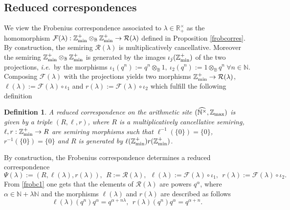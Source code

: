 \documentclass[noams,lp]{compositio}
\newtheorem{defn}[thm]{Definition} %
\def\B{{\mathbb B}}
\def\N{{\mathbb N}}
\def\R{{\mathbb R}}
\def\Z{{\mathbb Z}}
\def\cF{{\mathcal F}}
\def\cR{{\mathcal R}}
\newcommand{\ie}{{\it i.e.\/}\ }
\def\zmin{\Z_{\rm min}}
\def\zminp{\Z_{\rm min}^+}
\def\mc{multiplicatively cancellative }
\def\zmax{{\Z_{\rm max}}}
\def\arith{{(\wnt,\bar \N)}}
\def\wnt{{\widehat{\N^{\times}}}}
\def\nboplus{{\zmin^+\otimes_\B \zmin^+}}
\def\arith{{(\wnt,\zmax)}}
\begin{document}
\subsection{Reduced correspondences}
 We view  the Frobenius correspondence associated to $\lambda \in \R_+^\times$ as the homomorphism $\cF(\lambda):\nboplus\to \cR(\lambda)$
defined in Proposition \ref{frobcorres}. By construction, the semiring $\cR(\lambda)$ is multiplicatively cancellative. Moreover the semiring $\nboplus$ is generated by the images $\iota_j(\zminp)$ of the two projections, \ie by the morphisms
$
\iota_1(q^n):=q^n\otimes_\B 1, \    \iota_2(q^n):=1\otimes_\B q^n \ \forall n\in \N.
$
Composing $\cF(\lambda)$ with the projections yields two morphisms $\zminp\to\cR(\lambda)$,  $\ell(\lambda):=\cF(\lambda)\circ \iota_1$ and $r(\lambda):=\cF(\lambda)\circ \iota_2$  which fulfill the following definition


\begin{defn}\label{defcorr} A {\em reduced correspondence} on the arithmetic site $\arith$ is given by a triple $(R,\ell,r)$, where $R$ is a \mc semiring, $\ell, r: \zminp\to R$ are semiring morphisms such that $\ell^{-1}(\{0\})=\{0\}$, $r^{-1}(\{0\})=\{0\}$
and  $R$ is generated by $\ell(\zminp)r(\zminp)$. 
\end{defn}

By construction, the Frobenius correspondence 
determines a reduced correspondence 
\begin{equation}\label{frobcordef}
\Psi(\lambda):=(R,\ell(\lambda),r(\lambda)), \  \  R:=\cR(\lambda), \  \  \ell(\lambda):=\cF(\lambda)\circ \iota_1, \  \  r(\lambda):=\cF(\lambda)\circ \iota_2.
\end{equation}
From \eqref{frobc1} one gets that the elements of $\cR(\lambda)$ are powers $q^\alpha$, where $\alpha \in \N+\lambda \N$ and  the morphisms $\ell(\lambda)$ and $r(\lambda)$ are described as follows
\begin{equation}\label{morphism3}
\ell(\lambda)(q^n)q^\alpha=q^{\alpha +n\lambda}, \    \  r(\lambda)(q^n)q^\alpha=q^{\alpha +n}.
\end{equation}
\end{document}
